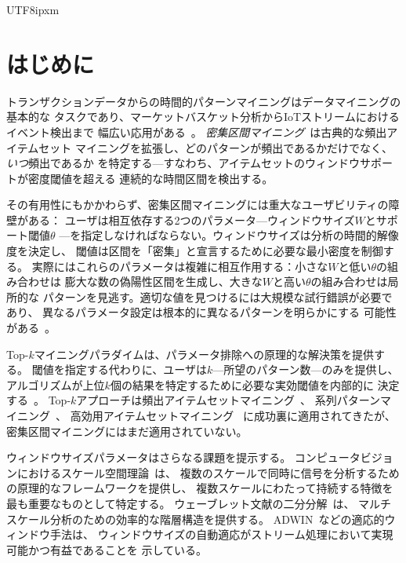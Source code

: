 \documentclass[conference]{IEEEtran}
\begin{document}
\begin{CJK}{UTF8}{ipxm}
\section{はじめに}\label{sec:intro}

トランザクションデータからの時間的パターンマイニングはデータマイニングの基本的な
タスクであり、マーケットバスケット分析からIoTストリームにおけるイベント検出まで
幅広い応用がある~\cite{agrawal1994fast,ho2022temporal}。
\emph{密集区間マイニング}~\cite{batal2012temporal}は古典的な頻出アイテムセット
マイニングを拡張し、どのパターンが頻出であるかだけでなく、\emph{いつ}頻出であるか
を特定する---すなわち、アイテムセットのウィンドウサポートが密度閾値を超える
連続的な時間区間を検出する。

その有用性にもかかわらず、密集区間マイニングには重大なユーザビリティの障壁がある：
ユーザは相互依存する2つのパラメータ---ウィンドウサイズ$W$とサポート閾値$\theta$
---を指定しなければならない。ウィンドウサイズは分析の時間的解像度を決定し、
閾値は区間を「密集」と宣言するために必要な最小密度を制御する。
実際にはこれらのパラメータは複雑に相互作用する：小さな$W$と低い$\theta$の組み合わせは
膨大な数の偽陽性区間を生成し、大きな$W$と高い$\theta$の組み合わせは局所的な
パターンを見逃す。適切な値を見つけるには大規模な試行錯誤が必要であり、
異なるパラメータ設定は根本的に異なるパターンを明らかにする
可能性がある~\cite{keogh2004parameter,ermshaus2022window}。

Top-$k$マイニングパラダイムは、パラメータ排除への原理的な解決策を提供する。
閾値を指定する代わりに、ユーザは$k$---所望のパターン数---のみを提供し、
アルゴリズムが上位$k$個の結果を特定するために必要な実効閾値を内部的に
決定する~\cite{fu2004mining,yadav2016topkminer,duong2016kHMC}。
Top-$k$アプローチは頻出アイテムセットマイニング~\cite{fatima2021tkfim}、
系列パターンマイニング~\cite{fournierviger2013tks}、
高効用アイテムセットマイニング~\cite{tseng2015tko,krishnamoorthy2018tkeh}
に成功裏に適用されてきたが、密集区間マイニングにはまだ適用されていない。

ウィンドウサイズパラメータはさらなる課題を提示する。
コンピュータビジョンにおけるスケール空間理論~\cite{lindeberg1994scale,lindeberg1998feature}は、
複数のスケールで同時に信号を分析するための原理的なフレームワークを提供し、
複数スケールにわたって持続する特徴を最も重要なものとして特定する。
ウェーブレット文献の二分分解~\cite{mallat1989multiresolution}は、
マルチスケール分析のための効率的な階層構造を提供する。
ADWIN~\cite{bifet2007adwin}などの適応的ウィンドウ手法は、
ウィンドウサイズの自動適応がストリーム処理において実現可能かつ有益であることを
示している。


\end{CJK}
\end{document}
